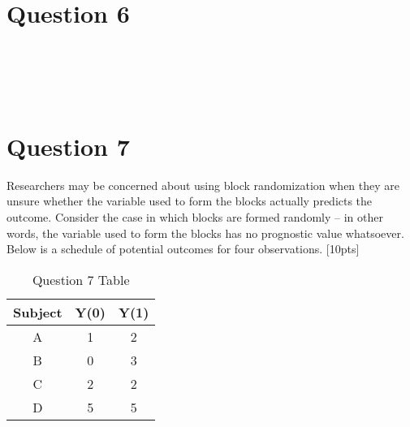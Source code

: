 \documentclass[11pt,notitlepage]{article}\usepackage[]{graphicx}\usepackage[]{color}
\makeatletter
\newenvironment{kframe}{%
 \def\at@end@of@kframe{}%
 \ifinner\ifhmode%
  \def\at@end@of@kframe{\end{minipage}}%
  \begin{minipage}{\columnwidth}%
 \fi\fi%
 \def\FrameCommand##1{\hskip\@totalleftmargin \hskip-\fboxsep
 \colorbox{shadecolor}{##1}\hskip-\fboxsep
     \hskip-\linewidth \hskip-\@totalleftmargin \hskip\columnwidth}%
 \MakeFramed {\advance\hsize-\width
   \@totalleftmargin\z@ \linewidth\hsize
   \@setminipage}}%
 {\par\unskip\endMakeFramed%
 \at@end@of@kframe}
\newenvironment{knitrout}{}{} %
\makeatother
\begin{document}
\section*{Question 6}
\begin{knitrout}
\color{fgcolor}\begin{kframe}
\begin{verbatim}





\end{verbatim}
\end{kframe}
\end{knitrout}

\section*{Question 7}
Researchers may be concerned about using block randomization when they are unsure whether the variable used to form the blocks actually predicts the outcome. Consider the case in which blocks are formed randomly -- in other words, the variable used to form the blocks has no prognostic value whatsoever. Below is a schedule of potential outcomes for four observations. [10pts]

\begin{table}[H]
  \centering
  \caption{Question 7 Table}
    \begin{tabular}{ccc}
    \toprule
    Subject & Y(0)  & Y(1) \\
    \midrule
    A     & 1     & 2 \\
    B     & 0     & 3 \\
    C     & 2     & 2 \\
    D     & 5     & 5 \\
    \bottomrule
    \end{tabular}%
  \label{tab:addlabel}%
\end{table}%
\end{document}
